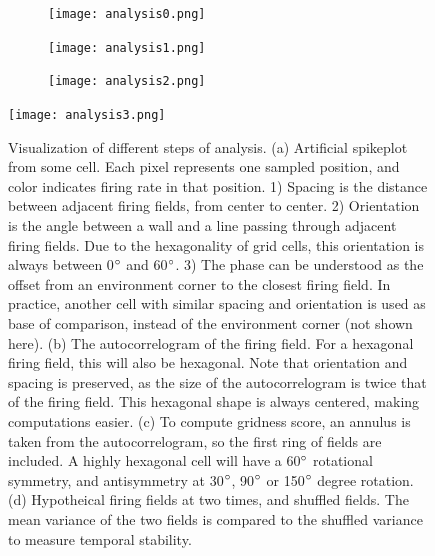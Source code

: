 \documentclass{article}
\begin{document}
    \begin{figure}[H]
        \centering
        \begin{minipage}[t]{\linewidth}
            \begin{subfigure}{0.32\linewidth}
                \subcaption{}
                \texttt{[image: analysis0.png]}
            \end{subfigure}
            \begin{subfigure}{0.32\linewidth}
                \subcaption{}
                \texttt{[image: analysis1.png]}
            \end{subfigure}
            \begin{subfigure}{0.32\linewidth}
                \subcaption{}
                \texttt{[image: analysis2.png]}
            \end{subfigure}
        \end{minipage}
        \begin{minipage}[t]{0.38\linewidth}
                \subcaption{}
                \texttt{[image: analysis3.png]}
        \end{minipage}
        \hspace{0.01\linewidth}
        \begin{minipage}[t]{0.59\linewidth}
            \caption{Visualization of different steps of analysis. (a) Artificial spikeplot from some cell. Each pixel represents one sampled position, and color indicates firing rate in that position. 1) Spacing is the distance between adjacent firing fields, from center to center. 2) Orientation is the angle between a wall and a line passing through adjacent firing fields. Due to the hexagonality of grid cells, this orientation is always between 0\(\degree\) and 60\(\degree\). 3) The phase can be understood as the offset from an environment corner to the closest firing field. In practice, another cell with similar spacing and orientation is used as base of comparison, instead of the environment corner (not shown here). (b) The autocorrelogram of the firing field. For a hexagonal firing field, this will also be hexagonal. Note that orientation and spacing is preserved, as the size of the autocorrelogram is twice that of the firing field. This hexagonal shape is always centered, making computations easier. (c) To compute gridness score, an annulus is taken from the autocorrelogram, so the first ring of fields are included. A highly hexagonal cell will have a 60\(\degree\) rotational symmetry, and antisymmetry at 30\(\degree\), 90\(\degree\) or 150\(\degree\) degree rotation. (d) Hypotheical firing fields at two times, and shuffled fields. The mean variance of the two fields is compared to the shuffled variance to measure temporal stability.}
            \label{analysis_plot}
        \end{minipage}
    \end{figure}
    
\end{document}
